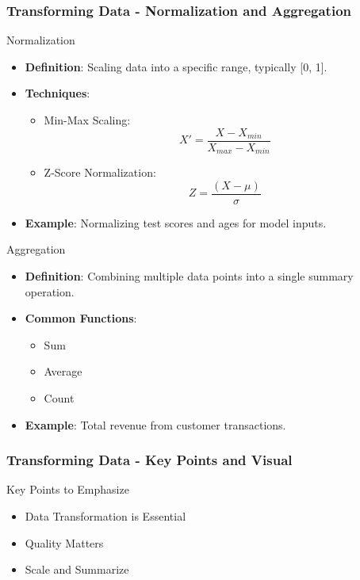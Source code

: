\documentclass[aspectratio=169]{beamer}
\begin{document}
\begin{frame}[fragile]
    \frametitle{Transforming Data - Normalization and Aggregation}
    \begin{block}{Normalization}
        \begin{itemize}
            \item \textbf{Definition}: Scaling data into a specific range, typically [0, 1].
            \item \textbf{Techniques}:
            \begin{itemize}
                \item Min-Max Scaling: 
                \[
                X' = \frac{X - X_{min}}{X_{max} - X_{min}}
                \]
                \item Z-Score Normalization:
                \[
                Z = \frac{(X - \mu)}{\sigma}
                \]
            \end{itemize}
            \item \textbf{Example}: Normalizing test scores and ages for model inputs.
        \end{itemize}
    \end{block}

    \begin{block}{Aggregation}
        \begin{itemize}
            \item \textbf{Definition}: Combining multiple data points into a single summary operation.
            \item \textbf{Common Functions}:
            \begin{itemize}
                \item Sum
                \item Average
                \item Count
            \end{itemize}
            \item \textbf{Example}: Total revenue from customer transactions.
        \end{itemize}
    \end{block}
\end{frame}

\begin{frame}[fragile]
    \frametitle{Transforming Data - Key Points and Visual}
    \begin{block}{Key Points to Emphasize}
        \begin{itemize}
            \item Data Transformation is Essential
            \item Quality Matters
            \item Scale and Summarize
        \end{itemize}
    \end{block}

\end{frame}
\end{document}
